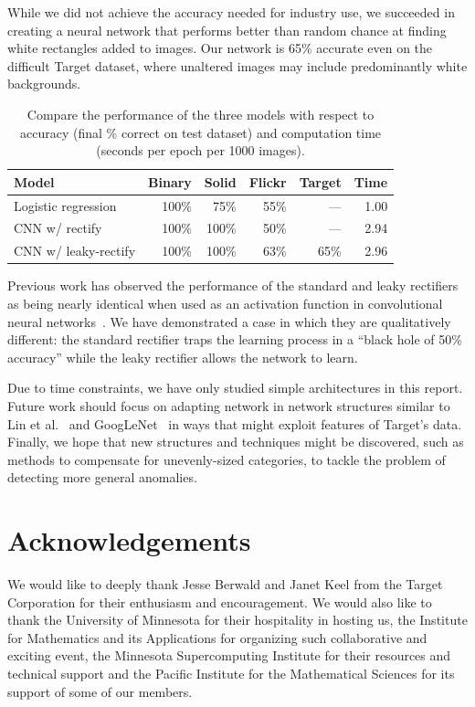 \documentclass{article}
\newcommand{\dataset}[1]{\textsf{#1}}
\begin{document}
  While we did not achieve the accuracy needed for industry use, we succeeded in creating a neural network that performs better than random chance at finding white rectangles added to images. Our network is 65\% accurate even on the difficult Target dataset, where unaltered images may include predominantly white backgrounds.

  \begin{table}[h]
    \centering
    \begin{tabular}{lrrrrr}\toprule
      \textbf{Model} & \textbf{\dataset{Binary}} & \textbf{\dataset{Solid}} & \textbf{\dataset{Flickr}} & \textbf{\dataset{Target}} & \textbf{Time}\\\midrule
      Logistic regression  & 100\% &  75\% &  55\% &  --- & 1.00 \\
      CNN w/ rectify       & 100\% & 100\% &  50\% &  --- & 2.94 \\
      CNN w/ leaky-rectify & 100\% & 100\% &  63\% & 65\% & 2.96 \\ \bottomrule
    \end{tabular}
    \caption{Compare the performance of the three models with respect to accuracy (final \% correct on test dataset) and computation time (seconds per epoch per 1000 images). }
  \end{table}

  Previous work has observed the performance of the standard and leaky rectifiers as being nearly identical when used as an activation function in convolutional neural networks~\cite{leakyrectify}. We have demonstrated a case in which they are qualitatively different: the standard rectifier traps the learning process in a ``black hole of 50\% accuracy'' while the leaky rectifier allows the network to learn.

  Due to time constraints, we have only studied simple architectures in this report. Future work should focus on adapting network in network structures similar to Lin et al.~\cite{NIN} and GoogLeNet~\cite{GDWC} in ways that might exploit features of Target's data. Finally, we hope that new structures and techniques might be discovered, such as methods to compensate for unevenly-sized categories, to tackle the problem of detecting more general anomalies.


\section{Acknowledgements} We would like to deeply thank Jesse Berwald and Janet Keel from the Target Corporation for their enthusiasm and encouragement. We would also like to thank the University of Minnesota for their hospitality in hosting us, the Institute for Mathematics and its Applications for organizing such collaborative and exciting event, the Minnesota Supercomputing Institute for their resources and technical support and the Pacific Institute for the Mathematical Sciences for its support of some of our members.
\end{document}
